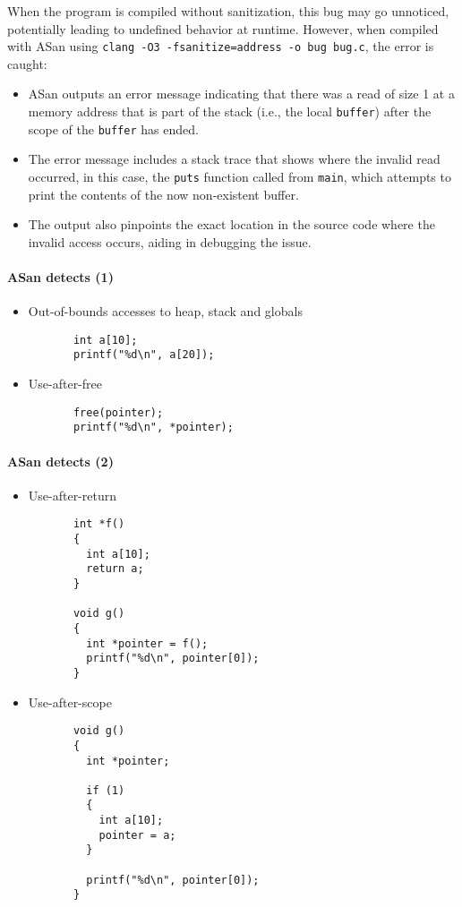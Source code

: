 \documentclass[12pt]{article}
\begin{document}
When the program is compiled without sanitization, this bug may go unnoticed, potentially leading to undefined behavior at runtime. However, when compiled with ASan using \texttt{clang -O3 -fsanitize=address -o bug bug.c}, the error is caught:

\begin{itemize}
    \item ASan outputs an error message indicating that there was a read of size 1 at a memory address that is part of the stack (i.e., the local \texttt{buffer}) after the scope of the \texttt{buffer} has ended.
    \item The error message includes a stack trace that shows where the invalid read occurred, in this case, the \texttt{puts} function called from \texttt{main}, which attempts to print the contents of the now non-existent buffer.
    \item The output also pinpoints the exact location in the source code where the invalid access occurs, aiding in debugging the issue.
\end{itemize}

\paragraph{ASan detects (1)}

\begin{itemize}
  \item Out-of-bounds accesses to heap, stack and globals
    \begin{lstlisting}
       int a[10];
       printf("%d\n", a[20]);
    \end{lstlisting}

  \item Use-after-free
    \begin{lstlisting}
       free(pointer);
       printf("%d\n", *pointer);
    \end{lstlisting}
\end{itemize}
\paragraph{ASan detects (2)}

\begin{itemize}
  \item Use-after-return
    \begin{lstlisting}
       int *f()
       {
         int a[10];
         return a;
       }
       
       void g()
       {
         int *pointer = f();
         printf("%d\n", pointer[0]);
       }
    \end{lstlisting}

  \item Use-after-scope
    \begin{lstlisting}
       void g()
       {
         int *pointer;
         
         if (1)
         {
           int a[10];
           pointer = a;
         }
          
         printf("%d\n", pointer[0]);
       }
    \end{lstlisting}
\end{itemize}
\end{document}
